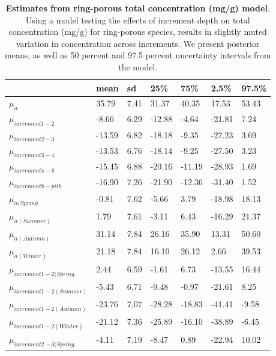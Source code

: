 \documentclass{article}\usepackage[]{graphicx}\usepackage[]{color}
\begin{document}
\begin{table}[ht]
\centering
\caption{\textbf{Estimates from ring-porous total concentration (mg/g) model}. Using a model testing the effects of increment depth on total concentration (mg/g) for ring-porous species, results in slightly muted variation in concentration across increments. We present posterior means, as well as 50 percent and 97.5 percent uncertainty intervals from the model.} 
\label{tab:ringtot}
\begingroup\footnotesize
\begin{tabular}{|p{}|p{}|p{}|p{}|p{}|p{}|p{}|}
  \hline
 & mean & sd & 25\% & 75\% & 2.5\% & 97.5\% \\ 
  \hline
$\mu_{\alpha}$ & 35.79 & 7.41 & 31.37 & 40.35 & 17.53 & 53.43 \\ 
  $\mu_{increment 1-2}$ & -8.66 & 6.29 & -12.88 & -4.64 & -21.81 & 7.24 \\ 
  $\mu_{increment 2-3}$ & -13.59 & 6.82 & -18.18 & -9.35 & -27.23 & 3.69 \\ 
  $\mu_{increment 3-4}$ & -13.53 & 6.76 & -18.14 & -9.25 & -27.50 & 3.23 \\ 
  $\mu_{increment 4-8}$ & -15.45 & 6.88 & -20.16 & -11.19 & -28.93 & 1.69 \\ 
  $\mu_{increment 8-pith}$ & -16.90 & 7.26 & -21.90 & -12.36 & -31.40 & 1.52 \\ 
  $\mu_{\alpha (Spring}$ & -0.81 & 7.62 & -5.66 & 3.79 & -18.98 & 18.13 \\ 
  $\mu_{\alpha (Summer)}$ & 1.79 & 7.61 & -3.11 & 6.43 & -16.29 & 21.37 \\ 
  $\mu_{\alpha (Autumn)}$ & 31.14 & 7.84 & 26.16 & 35.90 & 13.31 & 50.60 \\ 
  $\mu_{\alpha (Winter)}$ & 21.18 & 7.84 & 16.10 & 26.12 & 2.66 & 39.53 \\ 
  $\mu_{increment 1-2 (Spring}$ & 2.44 & 6.59 & -1.61 & 6.73 & -13.55 & 16.44 \\ 
  $\mu_{increment 1-2 (Summer)}$ & -5.43 & 6.71 & -9.48 & -0.97 & -21.61 & 8.25 \\ 
  $\mu_{increment 1-2 (Autumn)}$ & -23.76 & 7.07 & -28.28 & -18.83 & -41.41 & -9.58 \\ 
  $\mu_{increment 1-2 (Winter)}$ & -21.12 & 7.36 & -25.89 & -16.10 & -38.89 & -6.45 \\ 
  $\mu_{increment 2-3 (Spring}$ & -4.11 & 7.19 & -8.47 & 0.89 & -22.94 & 10.02 \\ 

\end{tabular}
\end{table}
\end{document}

